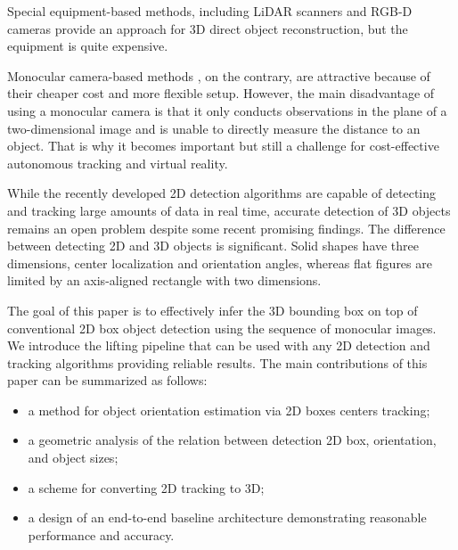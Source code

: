 \documentclass[graybox]{svmult}
\begin{document}
Special equipment-based methods, including LiDAR scanners \cite{lidar} and RGB-D cameras \cite{3d_cam}  provide an approach for 3D direct object reconstruction, but the equipment is quite expensive.

Monocular camera-based methods \cite{3d_geom}, on the contrary, are attractive because of their cheaper cost and more flexible setup. However, the main disadvantage of using a monocular camera is that it only conducts observations in the plane of a two-dimensional image and is unable to directly measure the distance to an object.
That is why it becomes important but still a challenge for cost-effective autonomous tracking and virtual reality. 

While the recently developed
2D detection algorithms are capable of detecting and tracking large amounts of data in real time, accurate detection of 3D objects
remains an open problem despite some recent promising findings.
The difference between detecting 2D and 3D objects is significant. Solid shapes have three dimensions, center localization and orientation angles, whereas flat figures are limited by an axis-aligned rectangle with two dimensions. 

The goal of this paper is to effectively infer the 3D bounding box on top of conventional 2D box object detection using the sequence of monocular images.
We introduce the lifting pipeline that can be used with any 2D detection and tracking algorithms providing reliable results.
The main contributions of this paper can be summarized as follows:
\begin{itemize}
    \item a method for object orientation estimation via  2D boxes centers tracking;
    \item a geometric analysis of the relation between detection 2D box, orientation, and object sizes;
    \item a scheme for converting 2D tracking to 3D;
    \item a design of an end-to-end baseline architecture demonstrating reasonable performance and accuracy.
\end{itemize}
\end{document}
